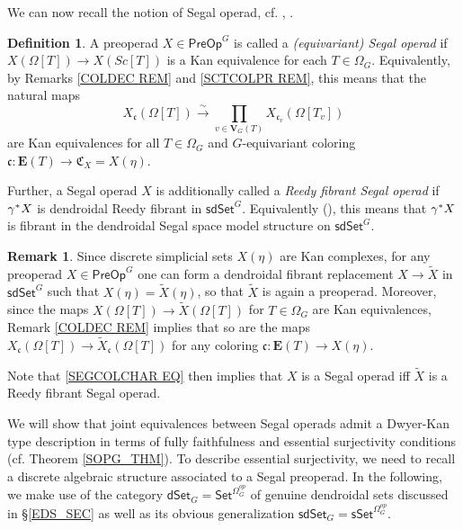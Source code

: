 \documentclass[a4paper,10pt
,draft
]{article}%
\numberwithin{equation}{section}
\numberwithin{figure}{section}
\theoremstyle{definition} %
\newtheorem{definition}[equation]{Definition}%
\newtheorem{remark}[equation]{Remark}%
\newcommand{\sdSet}{\mathsf{sdSet}}
\newcommand{\1}{\ensuremath{\mathbbm 1}}%
\begin{document}
We can now recall the notion of 
Segal operad, 
cf. \cite[Def. 5.5]{CM13b}, \cite[Def. 4.40]{BP_edss}.


\begin{definition}\label{SEGCOLCHAR DEF}
	A preoperad $X \in \mathsf{PreOp}^G$ is called a \emph{(equivariant) Segal operad} if
	$X\left( \Omega[T] \right) \to 
	X \left( Sc[T] \right)$
	is a Kan equivalence for each $T \in \Omega_G$.
%
	Equivalently, by Remarks \ref{COLDEC REM}
	and \ref{SCTCOLPR REM},
	this means that the natural maps
\begin{equation}\label{SEGCOLCHAR EQ}
	X_{\mathfrak{c}}(\Omega[T])
	\xrightarrow{\sim}
		\prod_{v \in \boldsymbol{V}_G(T)}
	X_{\mathfrak{c}_v}(\Omega[T_v])
\end{equation}
	are Kan equivalences for all 
	$T \in \Omega_G$
	and $G$-equivariant coloring
	$\mathfrak{c} \colon 
	\boldsymbol{E}(T) \to \mathfrak{C}_X = X(\eta)$.
	
	Further, a Segal operad $X$ is additionally called a
	\emph{Reedy fibrant Segal operad} 
	if $\gamma^{\**}X$ is dendroidal Reedy fibrant in $\sdSet^G$.
	Equivalently (\cite[Remark 4.41]{BP_edss}),
	this means that $\gamma^{\**}X$ is fibrant in the dendroidal Segal space model structure on $\sdSet^G$.
\end{definition}



\begin{remark}\label{REPSEGOPS REM}
Since discrete simplicial sets 
$X(\eta)$ are Kan complexes,
for any preoperad 
$X \in \mathsf{PreOp}^G$
one can form a dendroidal 
fibrant replacement 
$X \to \widetilde{X}$ in 
$\mathsf{sdSet}^G$
such that 
$X(\eta) = \widetilde{X}(\eta)$,
so that $\widetilde{X}$
is again a preoperad.
Moreover, since the maps
$X(\Omega[T]) \to \widetilde{X}(\Omega[T])$ for $T \in \Omega_G$
are Kan equivalences,
Remark \ref{COLDEC REM}
implies that so are the maps
$X_{\mathfrak{c}}(\Omega[T]) \to \widetilde{X}_{\mathfrak{c}}(\Omega[T])$
for any coloring
$\mathfrak{c} \colon \boldsymbol{E}(T) \to X(\eta)$.

Note that \eqref{SEGCOLCHAR EQ} 
then implies that $X$ is a Segal operad iff 
$\widetilde{X}$ is a Reedy fibrant Segal operad.
\end{remark}



We will show that joint equivalences 
between Segal operads
admit a Dwyer-Kan type description 
in terms of fully faithfulness and essential surjectivity 
conditions (cf. Theorem \ref{SOPG_THM}).
To describe essential surjectivity,
we need to recall a discrete 
algebraic structure associated to a Segal preoperad.
In the following, we make use of the category
$\mathsf{dSet}_G= \mathsf{Set}^{\Omega_G^{op}}$
of genuine dendroidal sets 
discussed in \S \ref{EDS_SEC}
as well as its obvious generalization
$\mathsf{sdSet}_G= \mathsf{sSet}^{\Omega_G^{op}}$.
\end{document}
